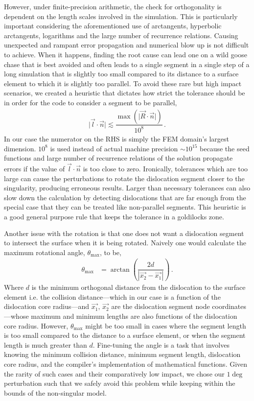 However, under finite-precision arithmetic, the check for orthogonality is dependent on the length scales involved in the simulation. This is particularly important considering the aforementioned use of arctangents, hyperbolic arctangents, logarithms and the large number of recurrence relations. Causing unexpected and rampant error propagation and numerical blow up is not difficult to achieve. When it happens, finding the root cause can lead one on a wild goose chase that is best avoided and often leads to a single segment in a single step of a long simulation that is slightly too small compared to its distance to a surface element to which it is slightly too parallel. To avoid these rare but high impact scenarios, we created a heuristic that dictates how strict the tolerance should be in order for the code to consider a segment to be parallel,
%
\begin{align}
    \lvert\vec{l}\cdot\vec{n}\rvert \lesssim \dfrac{\max\left(\lvert\vec{R}\cdot\vec{n}\rvert\right)}{10^8}\,.
\end{align}
%
In our case the numerator on the RHS is simply the FEM domain's largest dimension. $10^8$ is used instead of actual machine precision $\sim10^{15}$ because the seed functions and large number of recurrence relations of the solution propagate errors if the value of $\vec{l} \cdot \vec{n}$ is too close to zero. Ironically, tolerances which are too large can cause the perturbations to rotate the dislocation segment closer to the singularity, producing erroneous results. Larger than necessary tolerances can also slow down the calculation by detecting dislocations that are far enough from the special case that they can be treated like non-parallel segments. This heuristic is a good general purpose rule that keeps the tolerance in a goldilocks zone.

Another issue with the rotation is that one does not want a dislocation segment to intersect the surface when it is being rotated. Naively one would calculate the maximum rotational angle, $\theta_{\textrm{max}}$, to be,
%
\begin{align}
    \theta_{\textrm{max}} & = \arctan\left(\dfrac{2 d}{\left\lvert\vec{x_2} - \vec{x_1}\right\rvert}\right)\,.
\end{align}
%
Where $d$ is the minimum orthogonal distance from the dislocation to the surface element i.e. the collision distance---which in our case is a function of the dislocation core radius---and $\vec{x_1},\,\vec{x_2}$ are the dislocation segment node coordinates---whose maximum and minimum lengths are also functions of the dislocation core radius. However, $\theta_\textrm{max}$ might be too small in cases where the segment length is too small compared to the distance to a surface element, or when the segment length is much greater than $d$. Fine-tuning the angle is a task that involves knowing the minimum collision distance, minimum segment length, dislocation core radius, and the compiler's implementation of mathematical functions. Given the rarity of such cases and their comparatively low impact, we chose our $1\deg$ perturbation such that we safely avoid this problem while keeping within the bounds of the non-singular model.

